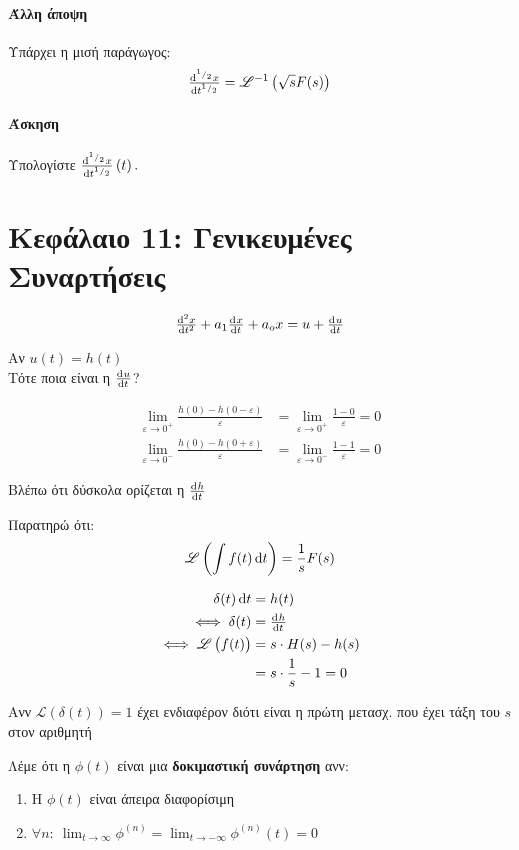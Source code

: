 \documentclass[11pt,a4paper,titlepage,final]{article}
\begin{document}
\paragraph{Άλλη άποψη} Υπάρχει η μισή παράγωγος:
\[
\od[ ^1/_2]{x}{t} = \mathscr L^{-1} \left(
\sqrt{s} F(s)
\right)
\]

\paragraph{Άσκηση} Υπολογίστε \(
\od[ ^1/_2]{x}{t} \left(
t
\right).
\)

\section{Κεφάλαιο 11: Γενικευμένες Συναρτήσεις}
\[
\od[2]{x}{t} + a_1 \od{x}{t} + a_ox = u +\od{u}{t}
\]

Αν \( u(t)=h(t) \) \\ 
Τότε ποια είναι η \( \od{u}{t} \)?

\begin{align*}
\lim_{\varepsilon \to 0^+}\frac{h(0)-h(0-\varepsilon)}{\varepsilon} &= \lim_{\varepsilon \to 0^+}\frac{1-0}{\varepsilon} = 0\\
\lim_{\varepsilon\to0^-} \frac{h(0)-h(0+\varepsilon)}{\varepsilon}&=\lim_{\varepsilon\to0^-}\frac{1-1}{\varepsilon} = 0
\end{align*}

Βλέπω ότι δύσκολα ορίζεται η \( \od{h}{t} \)

Παρατηρώ ότι:
\[
\mathscr L \left(\int f(t)\dif t \right) = \frac{1}{s} F(s)
\]

\begin{align*}
\delta(t) \dif t &= h(t) \\
\iff \delta(t) &= \od{h}{t} \\
\iff \mathscr L \left(f(t) \right) &= s \cdot H(s) - h(s) \\
&= s \cdot \frac{1}{s} - 1 = 0
\end{align*}

Ανν \( \mathscr L \left( \delta(t) \right) =1 \) έχει ενδιαφέρον διότι είναι η πρώτη μετασχ. που έχει τάξη του \( s \) στον αριθμητή

\begin{defn}{}{}
Λέμε ότι η \( \phi(t) \) είναι μια \textbf{δοκιμαστική συνάρτηση} ανν:

\begin{enumerate}
\item Η \( \phi(t) \) είναι άπειρα διαφορίσιμη
\item \( \forall n:\ \lim_{t \to \infty}\phi^{(n)} = \lim_{t\to - \infty}\phi^{(n)}(t) = 0 \)
\end{enumerate}

\end{defn}
\end{document}
